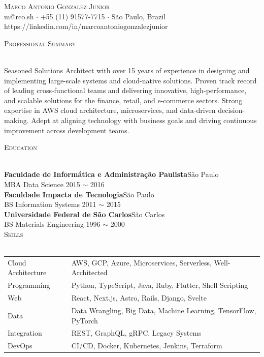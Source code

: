 \documentclass[a4paper]{article}
\newcommand{\lineunder} {
    \vspace*{-8pt} \\
    \hspace*{-18pt} \hrulefill \\
}
\newcommand{\header} [1] {
    \vspace{2mm}
    {\hspace*{-18pt}\vspace*{7pt} \textsc{#1}}
    \vspace*{-6pt} \lineunder
    \vspace{1mm}
}
\begin{document}
\vspace*{-40pt}

\vspace*{-10pt}
\begin{center}
    {\Huge \scshape {Marco Antonio Gonzalez Junior}}                \\
    \vspace{2.5pt}
    m@rco.sh $\cdot$ +55 (11) 91577-7715 $\cdot$ São Paulo, Brazil  \\
    \vspace{2.5pt}
    https://linkedin.com/in/marcoantoniogonzalezjunior              \\
\end{center}

\header{Professional Summary}
Seasoned Solutions Architect with over 15 years of experience in designing and implementing large-scale systems and cloud-native solutions. Proven track record of leading cross-functional teams and delivering innovative, high-performance, and scalable solutions for the finance, retail, and e-commerce sectors. Strong expertise in AWS cloud architecture, microservices, and data-driven decision-making. Adept at aligning technology with business goals and driving continuous improvement across development teams.

\header{Education}
\textbf{Faculdade de Informática e Administração Paulista}\hfill São Paulo\\
MBA Data Science \hfill 2015 $\sim$ 2016\\
\vspace{1mm}
\textbf{Faculdade Impacta de Tecnologia}\hfill São Paulo\\
BS Information Systems \hfill 2011 $\sim$ 2015\\
\vspace{1mm}
\textbf{Universidade Federal de São Carlos}\hfill São Carlos\\
BS Materials Engineering \hfill 1996 $\sim$ 2000\\


\header{Skills}
\vspace{1mm}
\begin{tabular}{ l l }
    Cloud Architecture & AWS, GCP, Azure, Microservices, Serverless, Well-Architected \\
    Programming & Python, TypeScript, Java, Ruby, Flutter, Shell Scripting \\
    Web & React, Next.js, Astro, Rails, Django, Svelte \\
    Data & Data Wrangling, Big Data, Machine Learning, TensorFlow, PyTorch \\
    Integration & REST, GraphQL, gRPC, Legacy Systems \\
    DevOps & CI/CD, Docker, Kubernetes, Jenkins, Terraform \\
\end{tabular}
\end{document}
